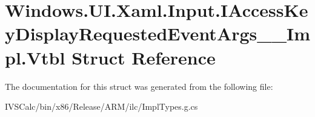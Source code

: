 \hypertarget{struct_windows_1_1_u_i_1_1_xaml_1_1_input_1_1_i_access_key_display_requested_event_args_____impl_1_1_vtbl}{}\section{Windows.\+U\+I.\+Xaml.\+Input.\+I\+Access\+Key\+Display\+Requested\+Event\+Args\+\_\+\+\_\+\+Impl.\+Vtbl Struct Reference}
\label{struct_windows_1_1_u_i_1_1_xaml_1_1_input_1_1_i_access_key_display_requested_event_args_____impl_1_1_vtbl}


The documentation for this struct was generated from the following file\+:\begin{DoxyCompactItemize}
\item 
I\+V\+S\+Calc/bin/x86/\+Release/\+A\+R\+M/ilc/Impl\+Types.\+g.\+cs\end{DoxyCompactItemize}

